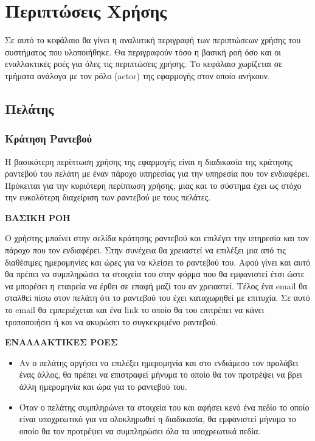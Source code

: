 
\chapter{Περιπτώσεις Χρήσης}
Σε αυτό το κεφάλαιο θα γίνει η αναλυτική περιγραφή των περιπτώσεων χρήσης του συστήματος που υλοποιήθηκε. Θα περιγραφούν τόσο η βασική ροή όσο και οι εναλλακτικές ροές για όλες τις περιπτώσεις χρήσης. Το κεφάλαιο χωρίζεται σε τμήματα ανάλογα με τον ρόλο (actor) της εφαρμογής στον οποίο ανήκουν.

\section{Πελάτης}
\subsection{Κράτηση Ραντεβού}
Η βασικότερη περίπτωση χρήσης της εφαρμογής είναι η διαδικασία της κράτησης ραντεβού του πελάτη με έναν πάροχο υπηρεσίας για την υπηρεσία που τον ενδιαφέρει. Πρόκειται για την κυριότερη περίπτωση χρήσης, μιας και το σύστημα έχει ως στόχο την ευκολότερη διαχείριση των ραντεβού με τους πελάτες. 

\textbf{ΒΑΣΙΚΗ ΡΟΗ}

Ο χρήστης μπαίνει στην σελίδα κράτησης ραντεβού και επιλέγει την υπηρεσία και τον πάροχο που τον ενδιαφέρει. Στην συνέχεια θα χρειαστεί να επιλέξει μια από τις διαθέσιμες ημερομηνίες και ώρες για να κλείσει το ραντεβού του. Αφού γίνει και αυτό θα πρέπει να συμπληρώσει τα στοιχεία του στην φόρμα που θα εμφανιστεί έτσι ώστε να μπορέσει η εταιρεία να έρθει σε επαφή μαζί του αν χρειαστεί. Τέλος ένα email θα σταλθεί πίσω στον πελάτη ότι το ραντεβού του έχει καταχωρηθεί με επιτυχία. Σε αυτό το email θα εμπεριέχεται και ένα link το οποίο θα του επιτρέπει να κάνει τροποποιήσει ή και να ακυρώσει το συγκεκριμένο ραντεβού.

\textbf{ΕΝΑΛΛΑΚΤΙΚΕΣ ΡΟΕΣ}

\begin{itemize}
\item Αν ο πελάτης αργήσει να επιλέξει ημερομηνία και στο ενδιάμεσο τον προλάβει ένας άλλος, θα πρέπει να επιστραφεί μήνυμα το οποίο θα τον προτρέψει να βρει άλλη ημερομηνία και ώρα για το ραντεβού του.
\item Όταν ο πελάτης συμπληρώνει τα στοιχεία του και αφήσει κενό ένα πεδίο το οποίο είναι υποχρεωτικό για να ολοκληρωθεί η διαδικασία, θα εμφανιστεί μήνυμα το οποίο θα τον προτρέψει να συμπληρώσει όλα τα υποχρεωτικά πεδία.
\end{itemize}

